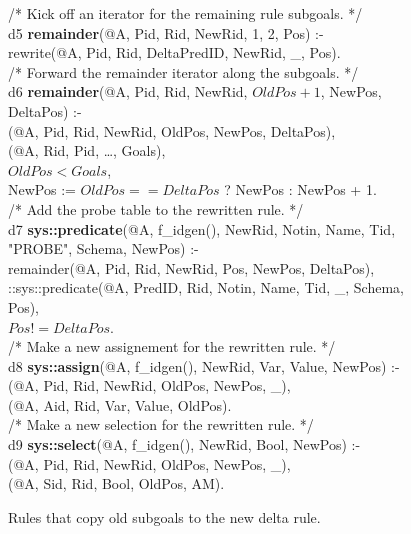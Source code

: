 \begin{figure}[!t]
\ssp
\centering
\begin{boxedminipage}{\linewidth}
/* Kick off an iterator for the remaining rule subgoals. */ \\
d5 {\bf remainder}(@A, Pid, Rid, NewRid, 1, 2, Pos) :- \\
\datalogspace rewrite(@A, Pid, Rid, DeltaPredID, NewRid, \_, Pos). \\

/* Forward the remainder iterator along the subgoals. */ \\
d6 {\bf remainder}(@A, Pid, Rid, NewRid, $OldPos+1$, NewPos, DeltaPos) :- \\
(@A, Pid, Rid, NewRid, OldPos, NewPos, DeltaPos), \\
(@A, Rid, Pid, \ldots, Goals), \\
\datalogspace $OldPos < Goals$, \\
\datalogspace NewPos := $OldPos == DeltaPos$ ? NewPos : NewPos + 1. \\

/* Add the probe table to the rewritten rule. */ \\
d7 {\bf sys::predicate}(@A, f\_idgen(), NewRid, Notin, Name, Tid, "PROBE", Schema, NewPos) :- \\
\datalogspace remainder(@A, Pid, Rid, NewRid, Pos, NewPos, DeltaPos), \\
\datalogspace ::sys::predicate(@A, PredID, Rid, Notin, Name, Tid, \_, Schema, Pos), \\
\datalogspace $Pos != DeltaPos$. \\

/* Make a new assignement for the rewritten rule. */ \\
d8 {\bf sys::assign}(@A, f\_idgen(), NewRid, Var, Value, NewPos) :- \\
(@A, Pid, Rid, NewRid, OldPos, NewPos, \_), \\
(@A, Aid, Rid, Var, Value, OldPos). \\

/* Make a new selection for the rewritten rule. */ \\
d9 {\bf sys::select}(@A, f\_idgen(), NewRid, Bool, NewPos) :- \\
(@A, Pid, Rid, NewRid, OldPos, NewPos, \_), \\
(@A, Sid, Rid, Bool, OldPos, AM).

\end{boxedminipage}
\caption{\label{ch:evita:fig:delta3}Rules that copy old subgoals to the new delta rule.}
\end{figure}

